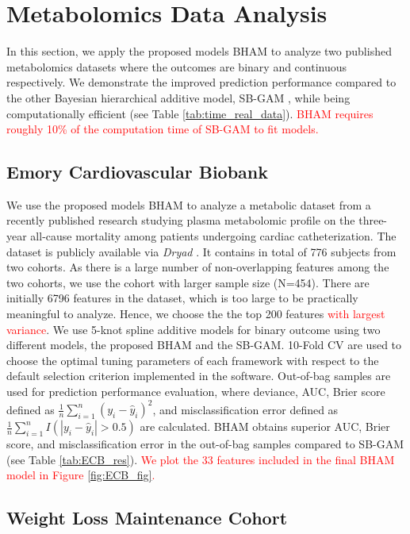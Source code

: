 \documentclass[AMA,STIX1COL,]{WileyNJD-v2}
\begin{document}
\section{Metabolomics Data Analysis}
\label{sec:real_data}

In this section, we apply the proposed models BHAM to analyze two
published metabolomics datasets where the outcomes are binary and
continuous respectively. We demonstrate the improved prediction
performance compared to the other Bayesian hierarchical additive model,
SB-GAM \citep{Bai2021}, while being computationally efficient (see Table
\ref{tab:time_real_data}).
\textcolor{red}{BHAM requires roughly 10\% of the computation time of SB-GAM to fit models.}

\subsection{Emory Cardiovascular Biobank}
\label{sec:ECB}

We use the proposed models BHAM to analyze a metabolic dataset from a
recently published research \citep{Mehta2020} studying plasma
metabolomic profile on the three-year all-cause mortality among patients
undergoing cardiac catheterization. The dataset is publicly available
via \textit{Dryad} \citep{Mehta2020_data}. It contains in total of 776
subjects from two cohorts. As there is a large number of non-overlapping
features among the two cohorts, we use the cohort with larger sample
size (N=454). There are initially 6796 features in the dataset, which is
too large to be practically meaningful to analyze. Hence, we choose the
the top 200 features \textcolor{red}{with largest variance}. We use
5-knot spline additive models for binary outcome using two different
models, the proposed BHAM and the SB-GAM. 10-Fold CV are used to choose
the optimal tuning parameters of each framework with respect to the
default selection criterion implemented in the software. Out-of-bag
samples are used for prediction performance evaluation, where deviance,
AUC, Brier score defined as
\(\frac{1}{n}\sum\limits^{n}_{i=1}(y_i - \hat y_i)^2\), and
misclassification error defined as
\(\frac{1}{n}\sum\limits^{n}_{i=1}I(|y_i - \hat y_i|>0.5)\) are
calculated. BHAM obtains superior AUC, Brier score, and
misclassification error in the out-of-bag samples compared to SB-GAM
(see Table \ref{tab:ECB_res}).
\textcolor{red}{We plot the 33 features included in the final BHAM model in Figure \ref{fig:ECB_fig}.}

\subsection{Weight Loss Maintenance Cohort}
\end{document}
